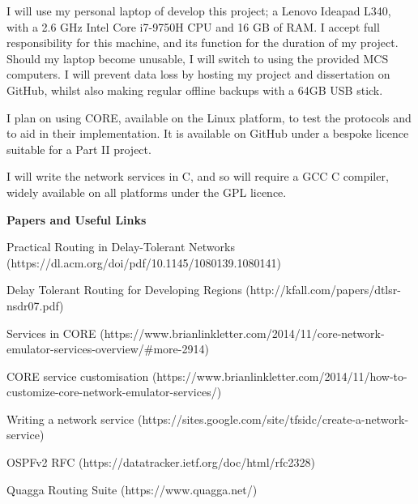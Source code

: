 \documentclass[withindex,glossary,openany]{cam-thesis}
\begin{document}
I will use my personal laptop of develop this project; a Lenovo Ideapad L340, with a 2.6 GHz Intel Core i7-9750H CPU and 16 GB of RAM. I accept full responsibility for this machine, and its function for the duration of my project. Should my laptop become unusable, I will switch to using the provided MCS computers. I will prevent data loss by hosting my project and dissertation on GitHub, whilst also making regular offline backups with a 64GB USB stick.

I plan on using CORE, available on the Linux platform, to test the protocols and to aid in their implementation. It is available on GitHub under a bespoke licence suitable for a Part II project.

I will write the network services in C, and so will require a GCC C compiler, widely available on all platforms under the GPL licence.

\vspace{8mm}
\LARGE\textbf{Papers and Useful Links}\normalsize

Practical Routing in Delay-Tolerant Networks (https://dl.acm.org/doi/pdf/10.1145/1080139.1080141)

Delay Tolerant Routing for Developing Regions (http://kfall.com/papers/dtlsr-nsdr07.pdf)

Services in CORE (https://www.brianlinkletter.com/2014/11/core-network-emulator-services-overview/\#more-2914)

CORE service customisation (https://www.brianlinkletter.com/2014/11/how-to-customize-core-network-emulator-services/)

Writing a network service (https://sites.google.com/site/tfsidc/create-a-network-service)

OSPFv2 RFC (https://datatracker.ietf.org/doc/html/rfc2328)

Quagga Routing Suite (https://www.quagga.net/)




\end{document}
